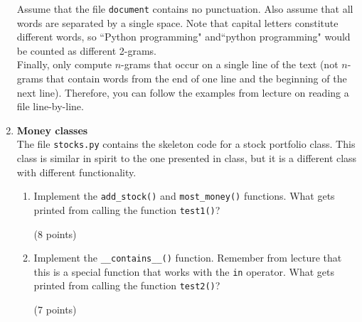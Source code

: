 \documentclass{article}
\newcounter{points}
\newcommand\setpoints[1]{\addtocounter{points}{#1}(#1 points)}
\begin{document}
\begin{enumerate}
Assume that the file \texttt{document} contains no punctuation.  Also assume that all words are separated by a single space. Note that capital letters constitute different words, so ``Python programming" and``python programming" would be counted as different 2-grams. \\

Finally, only compute $n$-grams that occur on a single line of the text (not $n$-grams that contain words from the end of one line and the beginning of the next line).  Therefore, you can follow the examples from lecture on reading a file line-by-line. \\




\item \textbf{Money classes} \\
The file \texttt{stocks.py} contains the skeleton code for a stock portfolio class.  This class is similar in spirit to the one presented in class, but it is a different class with different functionality.

\begin{enumerate}
\item Implement the \texttt{add\_stock()} and \texttt{most\_money()} functions.  What gets printed from calling the function \texttt{test1()}? \setpoints{8}
\end{enumerate}

\begin{enumerate}
\setcounter{enumii}{1}
\item Implement the \texttt{\_\_contains\_\_()} function.  Remember from lecture that this is a special function that works with the \texttt{in} operator.  What gets printed from calling the function \texttt{test2()}? \setpoints{7}
\end{enumerate}


\end{enumerate}
\end{document}
